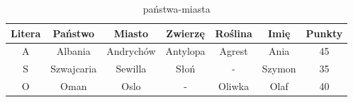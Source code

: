 \begin{table}[htbp]
\begin{tabular}{|c|c|c|c|c|c|c|}
\hline
Litera & Państwo    & Miasto    & Zwierzę  & Roślina & Imię   & Punkty \\ \hline
A      & Albania    & Andrychów & Antylopa & Agrest  & Ania   & 45     \\ \hline
S      & Szwajcaria & Sewilla   & Słoń     & -       & Szymon & 35     \\ \hline
O      & Oman       & Oslo      & -        & Oliwka  & Olaf   & 40     \\ \hline
\end{tabular}
\caption{państwa-miasta}
\label{tab:janek}
\end{table}